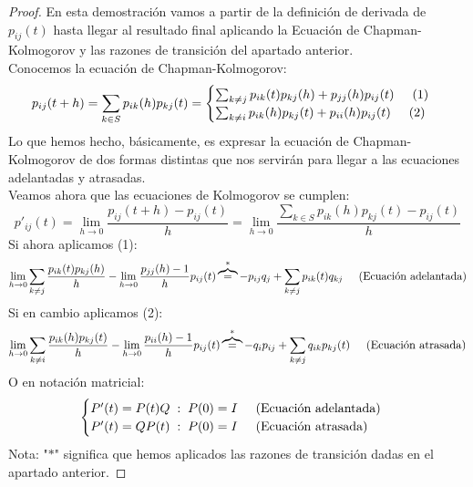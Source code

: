 \documentclass[12pt,a4paper]{article}
\begin{document}
	\begin{proof}
		En esta demostración vamos a partir de la definición de derivada de $p_{ij}(t)$ hasta llegar al resultado final aplicando la Ecuación de Chapman-Kolmogorov y las razones de transición del apartado anterior.
		\\[0.2cm]
		Conocemos la ecuación de Chapman-Kolmogorov:
		\begin{equation*}
			p_{ij}(t+h) = \sum_{k \in S}p_{ik}(h)p_{kj}(t) = 
			\begin{cases}
				\sum_{k \neq j}p_{ik}(t)p_{kj}(h) + p_{jj}(h)p_{ij}(t) \hspace{0.5cm} (1)
				\\
				\sum_{k \neq i}p_{ik}(h)p_{kj}(t) + p_{ii}(h)p_{ij}(t) \hspace{0.5cm} (2)
			\end{cases}
		\end{equation*}
		Lo que hemos hecho, básicamente, es expresar la ecuación de Chapman-Kolmogorov de dos formas distintas que nos servirán para llegar a las ecuaciones adelantadas y atrasadas.
		\\[0.2cm]
		Veamos ahora que las ecuaciones de Kolmogorov se cumplen:
		\begin{equation*}
			p'_{ij}(t) = \lim_{h \rightarrow 0} \frac{p_{ij}(t+h) - p_{ij}(t)}{h} = \lim_{h \rightarrow 0} \frac{\sum_{k \in S}p_{ik}(h)p_{kj}(t) - p_{ij}(t)}{h}
		\end{equation*}
		Si ahora aplicamos (1):
		\begin{equation*}
			\lim_{h \rightarrow 0} \sum_{k \neq j}\frac{p_{ik}(t)p_{kj}(h)}{h} - \lim_{h \rightarrow 0}\frac{p_{jj}(h) - 1}{h}p_{ij}(t) \overbrace{=}^{*} -p_{ij}q_{j} + \sum_{k \neq j} p_{ik}(t)q_{kj}\hspace{0.5cm} \text{(Ecuación adelantada)}
		\end{equation*}
		Si en cambio aplicamos (2):
		\begin{equation*}
			\lim_{h \rightarrow 0} \sum_{k \neq i}\frac{p_{ik}(h)p_{kj}(t)}{h} - \lim_{h \rightarrow 0}\frac{p_{ii}(h) - 1}{h}p_{ij}(t) \overbrace{=}^{*} -q_{i}p_{ij} + \sum_{k \neq j} q_{ik}p_{kj}(t)\hspace{0.5cm} \text{(Ecuación atrasada)}
		\end{equation*}
		O en notación matricial:
		\begin{equation*}
			\begin{cases}
				P'(t) = P(t)Q\hspace{0.1cm}:\hspace{0.1cm}P(0) = I\hspace{0.5cm} \text{(Ecuación adelantada)} \\
				P'(t) = QP(t)\hspace{0.1cm}:\hspace{0.1cm}P(0) = I\hspace{0.5cm} \text{(Ecuación atrasada)}
			\end{cases}
		\end{equation*}
		Nota: "$*$" significa que hemos aplicados las razones de transición dadas en el apartado anterior.
	\end{proof}
\end{document}
